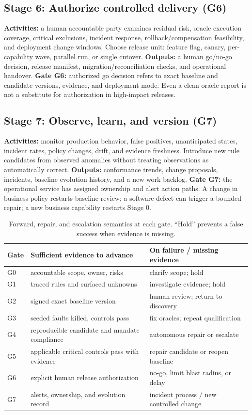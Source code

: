 \documentclass[11pt,a4paper]{article}
\begin{document}
\subsection{Stage 6: Authorize controlled delivery (G6)}
\textbf{Activities:} a human accountable party examines residual risk, oracle execution coverage, critical exclusions, incident response, rollback/compensation feasibility, and deployment change windows. Choose release unit: feature flag, canary, per-capability wave, parallel run, or single cutover. \textbf{Outputs:} a human go/no-go decision, release manifest, migration/reconciliation checks, and operational handover. \textbf{Gate G6:} authorized go decision refers to exact baseline and candidate versions, evidence, and deployment mode. Even a clean oracle report is not a substitute for authorization in high-impact releases.

\subsection{Stage 7: Observe, learn, and version (G7)}
\textbf{Activities:} monitor production behavior, false positives, unanticipated states, incident rates, policy changes, drift, and evidence freshness. Introduce new rule candidates from observed anomalies without treating observations as automatically correct. \textbf{Outputs:} conformance trends, change proposals, incidents, baseline evolution history, and a new work backlog. \textbf{Gate G7:} the operational service has assigned ownership and alert action paths. A change in business policy restarts baseline review; a software defect can trigger a bounded repair; a new business capability restarts Stage 0.

\begin{table}[htbp]
\centering\small
\caption{Forward, repair, and escalation semantics at each gate. ``Hold'' prevents a false success when evidence is missing.}
\begin{tabularx}{\linewidth}{@{}lX X@{}}
\toprule
Gate & Sufficient evidence to advance & On failure / missing evidence \\
\midrule
G0 & accountable scope, owner, risks & clarify scope; hold \\
G1 & traced rules and surfaced unknowns & investigate evidence; hold \\
G2 & signed exact baseline version & human review; return to discovery \\
G3 & seeded faults killed, controls pass & fix oracles; repeat qualification \\
G4 & reproducible candidate and mandate compliance & autonomous repair or escalate \\
G5 & applicable critical controls pass with evidence & repair candidate or reopen baseline \\
G6 & explicit human release authorization & no-go, limit blast radius, or delay \\
G7 & alerts, ownership, and evolution record & incident process / new controlled change \\
\bottomrule
\end{tabularx}
\label{tab:gates}
\end{table}
\end{document}
